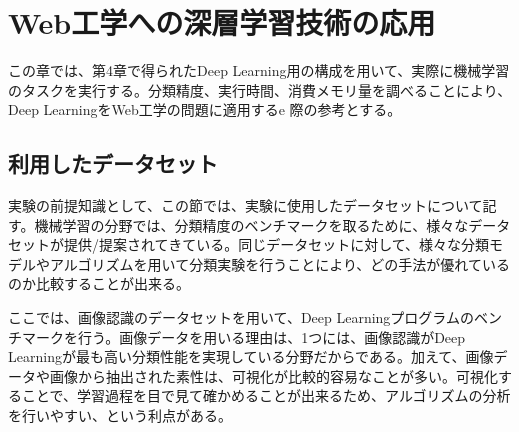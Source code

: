 \chapter{Web工学への深層学習技術の応用}
この章では、第4章で得られたDeep Learning用の構成を用いて、実際に機械学習のタスクを実行する。分類精度、実行時間、消費メモリ量を調べることにより、Deep LearningをWeb工学の問題に適用するe
際の参考とする。
\section{利用したデータセット}
実験の前提知識として、この節では、実験に使用したデータセットについて記す。機械学習の分野では、分類精度のベンチマークを取るために、様々なデータセットが提供/提案されてきている。同じデータセットに対して、様々な分類モデルやアルゴリズムを用いて分類実験を行うことにより、どの手法が優れているのか比較することが出来る。\par
ここでは、画像認識のデータセットを用いて、Deep Learningプログラムのベンチマークを行う。画像データを用いる理由は、1つには、画像認識がDeep Learningが最も高い分類性能を実現している分野だからである。加えて、画像データや画像から抽出された素性は、可視化が比較的容易なことが多い。可視化することで、学習過程を目で見て確かめることが出来るため、アルゴリズムの分析を行いやすい、という利点がある。
